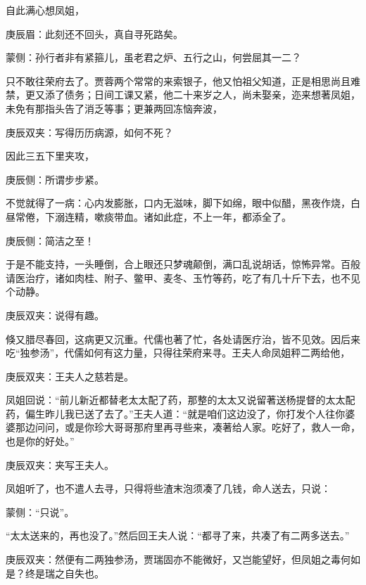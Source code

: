 \begin{parag}
    自此满心想凤姐，\begin{note}庚辰眉：此刻还不回头，真自寻死路矣。\end{note}\begin{note}蒙侧：孙行者非有紧箍儿，虽老君之炉、五行之山，何尝屈其一二？\end{note}只不敢往荣府去了。贾蓉两个常常的来索银子，他又怕祖父知道，正是相思尚且难禁，更又添了债务；日间工课又紧，他二十来岁之人，尚未娶亲，迩来想著凤姐，未免有那指头告了消乏等事；更兼两回冻恼奔波，\begin{note}庚辰双夹：写得历历病源，如何不死？\end{note}因此三五下里夹攻，\begin{note}庚辰侧：所谓步步紧。\end{note}不觉就得了一病：心内发膨胀，口内无滋味，脚下如绵，眼中似醋，黑夜作烧，白昼常倦，下溺连精，嗽痰带血。诸如此症，不上一年，都添全了。\begin{note}庚辰侧：简洁之至！\end{note}于是不能支持，一头睡倒，合上眼还只梦魂颠倒，满口乱说胡话，惊怖异常。百般请医治疗，诸如肉桂、附子、鳖甲、麦冬、玉竹等药，吃了有几十斤下去，也不见个动静。\begin{note}庚辰双夹：说得有趣。\end{note}
\end{parag}


\begin{parag}
    倏又腊尽春回，这病更又沉重。代儒也著了忙，各处请医疗治，皆不见效。因后来吃“独参汤”，代儒如何有这力量，只得往荣府来寻。王夫人命凤姐秤二两给他，\begin{note}庚辰双夹：王夫人之慈若是。\end{note}凤姐回说：“前儿新近都替老太太配了药，那整的太太又说留著送杨提督的太太配药，偏生昨儿我已送了去了。”王夫人道：“就是咱们这边没了，你打发个人往你婆婆那边问问，或是你珍大哥哥那府里再寻些来，凑著给人家。吃好了，救人一命，也是你的好处。”\begin{note}庚辰双夹：夹写王夫人。\end{note}凤姐听了，也不遣人去寻，只得将些渣末泡须凑了几钱，命人送去，只说：\begin{note}蒙侧：“只说”。\end{note}“太太送来的，再也没了。”然后回王夫人说：“都寻了来，共凑了有二两多送去。”\begin{note}庚辰双夹：然便有二两独参汤，贾瑞固亦不能微好，又岂能望好，但凤姐之毒何如是？终是瑞之自失也。\end{note}
\end{parag}


